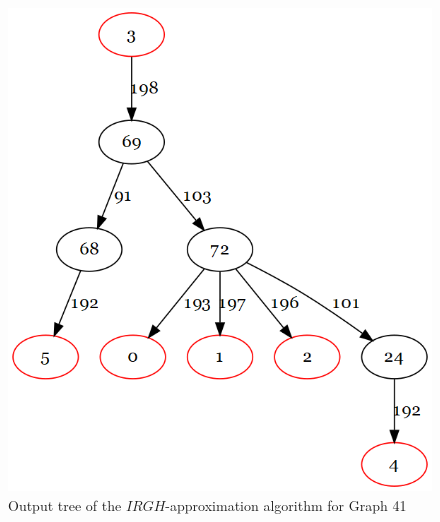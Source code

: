 \begin{figure}[htbp]
\centering
\includegraphics[scale=0.40]{figures/HougardyProemel.png}
\caption{Output tree of the $IRGH$-approximation algorithm for Graph 41}\label{fig:HoPrTree41}
\end{figure}
